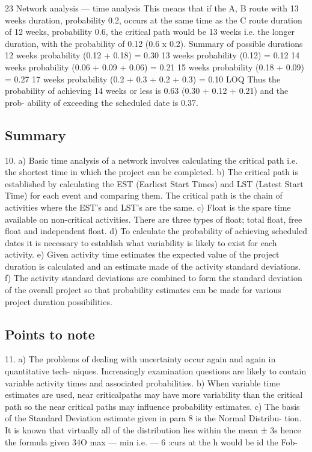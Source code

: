 \documentclass[]{report}
\begin{document}
23 Network analysis — time analysis 
This means that if the A, B route with 13 weeks duration, probability 0.2, occurs at the 
same time as the C route duration of 12 weeks, probability 0.6, the critical path would be 
13 weeks i.e. the longer duration, with the probability of 0.12 (0.6 x 0.2). Summary of possible durations 
12 weeks probability (0.12 + 0.18) = 0.30 
13 weeks probability (0.12) = 0.12 
14 weeks probability (0.06 + 0.09 + 0.06) = 0.21 
15 weeks probability (0.18 + 0.09) = 0.27 
17 weeks probability (0.2 + 0.3 + 0.2 + 0.3) = 0.10 
LOQ Thus the probability of achieving 14 weeks or less is 0.63 (0.30 + 0.12 + 0.21) and the prob-
ability of exceeding the scheduled date is 0.37. 
\subsection{Summary}
10. a) Basic time analysis of a network involves calculating the critical path i.e. the shortest 
time in which the project can be completed. 
b) The critical path is established by calculating the EST (Earliest Start Times) and LST 
(Latest Start Time) for each event and comparing them. The critical path is the chain 
of activities where the EST's and LST's are the same. 
c) Float is the spare time available on non-critical activities. There are three types of 
float; total float, free float and independent float. 
d) To calculate the probability of achieving scheduled dates it is necessary to establish 
what variability is likely to exist for each activity. 
e) Given activity time estimates the expected value of the project duration is calculated 
and an estimate made of the activity standard deviations. 
f) The activity standard deviations are combined to form the standard deviation of the 
overall project so that probability estimates can be made for various project duration 
possibilities. 
\subsection{Points to note}
11. a) The problems of dealing with uncertainty occur again and again in quantitative tech-
niques. Increasingly examination questions are likely to contain variable activity 
times and associated probabilities. 
b) When variable time estimates are used, near criticalpaths may have more variability 
than the critical path so the near critical paths may influence probability estimates. 
c) The basis of the Standard Deviation estimate given in para 8 is the Normal Distribu-
tion. It is known that virtually all of the distribution lies within the mean ± 3s hence 
the formula given 
34O 
max — min 
i.e.   — 
6 
:curs at the 
h would be 
id the Fob- 
\end{document}
